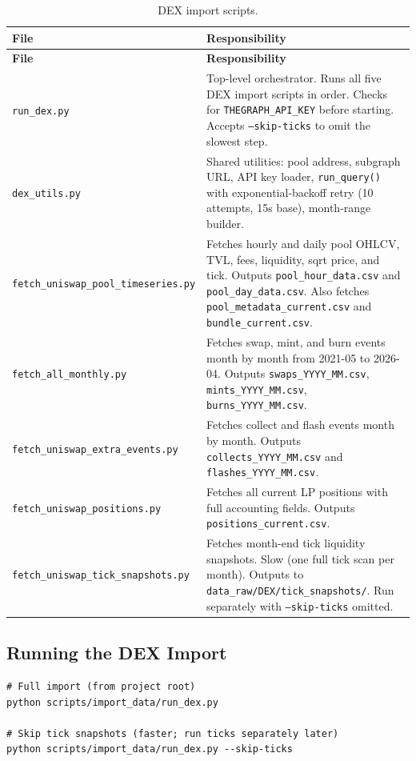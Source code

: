 \documentclass[11pt,a4paper]{article}
\begin{document}
\begin{longtable}{L{5.2cm}L{9.2cm}}
\caption{DEX import scripts.}\\
\toprule
\textbf{File} & \textbf{Responsibility} \\
\midrule
\endfirsthead
\toprule
\textbf{File} & \textbf{Responsibility} \\
\midrule
\endhead
\bottomrule
\endfoot
\texttt{run\_dex.py} & Top-level orchestrator. Runs all five DEX import scripts in order. Checks for \texttt{THEGRAPH\_API\_KEY} before starting. Accepts \texttt{--skip-ticks} to omit the slowest step. \\
\texttt{dex\_utils.py} & Shared utilities: pool address, subgraph URL, API key loader, \texttt{run\_query()} with exponential-backoff retry (10 attempts, 15s base), month-range builder. \\
\texttt{fetch\_uniswap\_pool\_timeseries.py} & Fetches hourly and daily pool OHLCV, TVL, fees, liquidity, sqrt price, and tick. Outputs \texttt{pool\_hour\_data.csv} and \texttt{pool\_day\_data.csv}. Also fetches \texttt{pool\_metadata\_current.csv} and \texttt{bundle\_current.csv}. \\
\texttt{fetch\_all\_monthly.py} & Fetches swap, mint, and burn events month by month from 2021-05 to 2026-04. Outputs \texttt{swaps\_YYYY\_MM.csv}, \texttt{mints\_YYYY\_MM.csv}, \texttt{burns\_YYYY\_MM.csv}. \\
\texttt{fetch\_uniswap\_extra\_events.py} & Fetches collect and flash events month by month. Outputs \texttt{collects\_YYYY\_MM.csv} and \texttt{flashes\_YYYY\_MM.csv}. \\
\texttt{fetch\_uniswap\_positions.py} & Fetches all current LP positions with full accounting fields. Outputs \texttt{positions\_current.csv}. \\
\texttt{fetch\_uniswap\_tick\_snapshots.py} & Fetches month-end tick liquidity snapshots. Slow (one full tick scan per month). Outputs to \texttt{data\_raw/DEX/tick\_snapshots/}. Run separately with \texttt{--skip-ticks} omitted. \\
\end{longtable}

\subsection{Running the DEX Import}

\begin{lstlisting}
# Full import (from project root)
python scripts/import_data/run_dex.py

# Skip tick snapshots (faster; run ticks separately later)
python scripts/import_data/run_dex.py --skip-ticks
\end{lstlisting}
\end{document}
